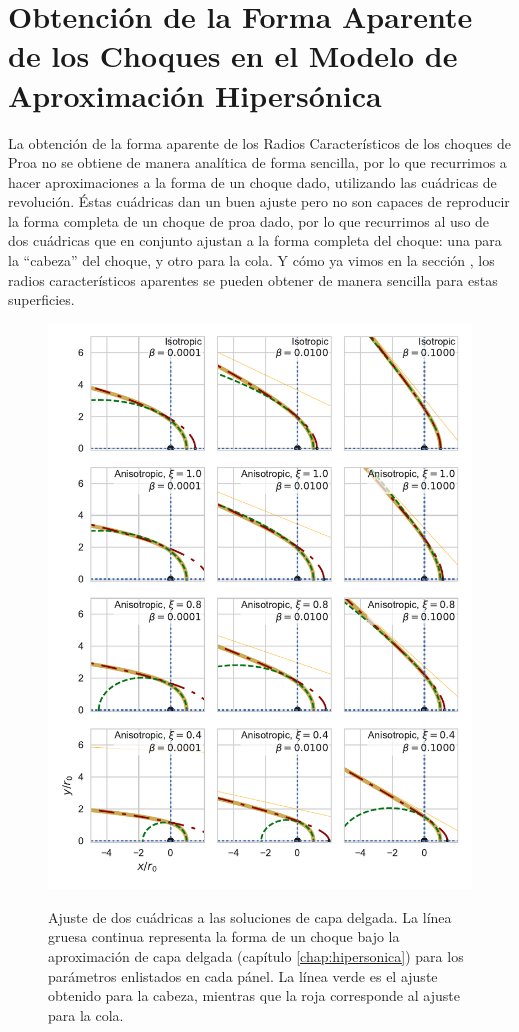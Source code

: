 \chapter{Obtención de la Forma Aparente de los Choques en el Modelo de Aproximación Hipersónica}
La obtención de la forma aparente de los Radios Característicos de los choques de Proa
no se obtiene de manera analítica de forma sencilla, por lo que recurrimos a hacer
aproximaciones a la forma de un choque dado, utilizando las cuádricas de revolución.
Éstas cuádricas dan un buen ajuste pero no son capaces de reproducir la forma completa
de un choque de proa dado, por lo que recurrimos al uso de dos cuádricas que en conjunto
ajustan a la forma completa del choque: una para la ``cabeza'' del choque, y otro para la cola.
Y cómo ya vimos en la sección , los radios característicos aparentes se pueden obtener de
manera sencilla para estas superficies.

\begin{figure}
  \includegraphics[width = 0.8\linewidth]{./Figures/conic-head-tail-analytic}
  \label{fig:conic-head-tail-fit}
  \caption{Ajuste de dos cuádricas a las soluciones de capa delgada. La línea gruesa continua
    representa la forma de un choque bajo la aproximación de capa delgada (capítulo
    \ref{chap:hipersonica}) para los parámetros enlistados en cada pánel. La línea verde es el
    ajuste obtenido para la cabeza, mientras que la roja corresponde al ajuste para la cola.}
\end{figure}


